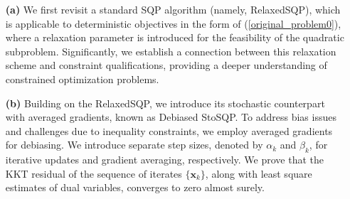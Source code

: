 \documentclass[aos]{imsart}
\numberwithin{equation}{section}
\theoremstyle{plain}
\begin{document}
\begin{enumerate}
    \item[\textbf{(a)}] We first revisit a standard SQP algorithm (namely, RelaxedSQP), which is applicable to deterministic objectives in the form of (\ref{original_problem0}), where a relaxation parameter is introduced for the feasibility of the quadratic subproblem. Significantly, we establish a connection between this relaxation scheme and constraint qualifications, providing a deeper understanding of constrained optimization problems.
    

    \item[\textbf{(b)}] Building on the RelaxedSQP, we introduce its stochastic counterpart with averaged gradients, known as Debiased StoSQP. To address bias issues and challenges due to inequality constraints, we employ averaged gradients for debiasing. We introduce separate step sizes, denoted by  $\alpha_k$ and $\beta_k$, for iterative updates and gradient averaging, respectively. We prove that the KKT residual of the sequence of iterates  $\{\bm{x}_k\}$, along with least square estimates of dual variables, converges to zero almost surely. 


\end{enumerate}
\end{document}
